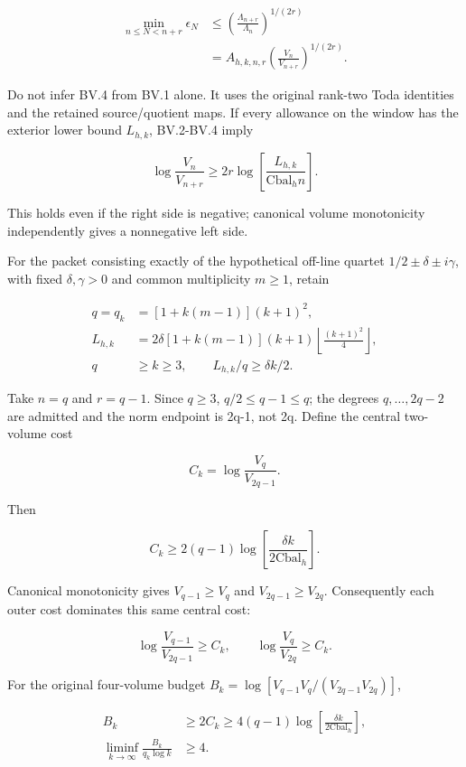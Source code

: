 \[
\begin{aligned}
\min_{n\le N<n+r}\epsilon_N
&\le\left(\frac{\Lambda_{n+r}}{\Lambda_n}\right)^{1/(2r)}\\
&=A_{h,k,n,r}\left(\frac{V_n}{V_{n+r}}\right)^{1/(2r)}.
\end{aligned}\tag{BV.4}
\]

Do not infer BV.4 from BV.1 alone. It uses the original rank-two Toda identities and the retained source/quotient maps. If every allowance on the window has the exterior lower bound \(L_{h,k}\), BV.2-BV.4 imply

\[
\log\frac{V_n}{V_{n+r}}\ge2r\log\left[\frac{L_{h,k}}{\mathrm{Cbal}_hn}\right].\tag{BV.5}
\]

This holds even if the right side is negative; canonical volume monotonicity independently gives a nonnegative left side.

For the packet consisting exactly of the hypothetical off-line quartet \(1/2\pm\delta\pm i\gamma\), with fixed \(\delta,\gamma>0\) and common multiplicity \(m\ge1\), retain

\[
\begin{aligned}
q=q_k&=[1+k(m-1)](k+1)^2,\\
L_{h,k}&=2\delta[1+k(m-1)](k+1)
\left\lfloor\frac{(k+1)^2}{4}\right\rfloor,\\
q&\ge k\ge3,\qquad L_{h,k}/q\ge\delta k/2.
\end{aligned}
\]

Take \(n=q\) and \(r=q-1\). Since \(q\ge3\), \(q/2\le q-1\le q\); the degrees \(q,\ldots,2q-2\) are admitted and the norm endpoint is 2q-1, not 2q. Define the central two-volume cost

\[
C_k=\log\frac{V_q}{V_{2q-1}}.
\]

Then

\[
C_k\ge2(q-1)\log\left[\frac{\delta k}{2\mathrm{Cbal}_h}\right].\tag{BV.6}
\]

Canonical monotonicity gives \(V_{q-1}\ge V_q\) and \(V_{2q-1}\ge V_{2q}\). Consequently each outer cost dominates this same central cost:

\[
\log\frac{V_{q-1}}{V_{2q-1}}\ge C_k,\qquad
\log\frac{V_q}{V_{2q}}\ge C_k.
\]

For the original four-volume budget \(B_k=\log[V_{q-1}V_q/(V_{2q-1}V_{2q})]\),

\[
\begin{aligned}
B_k&\ge2C_k\ge4(q-1)\log\left[\frac{\delta k}{2\mathrm{Cbal}_h}\right],\\
\liminf_{k\to\infty}\frac{B_k}{q_k\log k}&\ge4.
\end{aligned}\tag{BV.7}
\]

